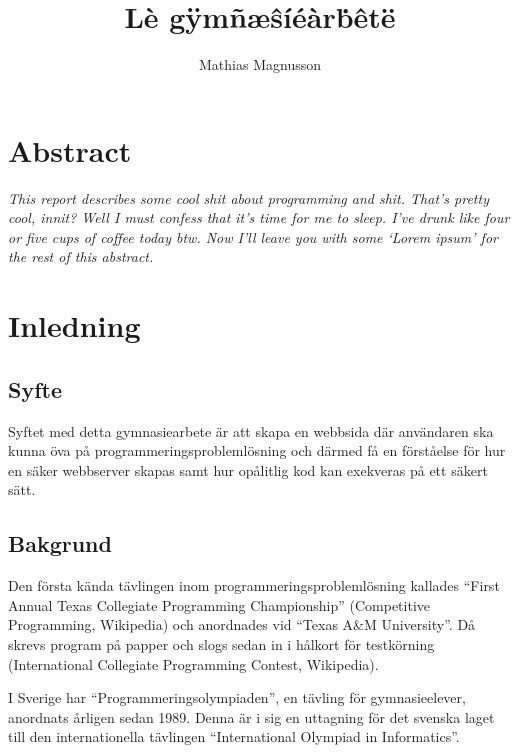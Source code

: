 \documentclass{article}
\author{Mathias Magnusson}
\title{Lè gÿmñæŝíéàrḃêtë}
\date{}
\begin{document}
\maketitle{}

\section*{Abstract}

\begin{par}

\itshape
This report describes some cool shit about programming and shit. That's pretty
cool, innit? Well I must confess that it's time for me to sleep. I've drunk like
four or five cups of coffee today btw. Now I'll leave you with some `Lorem
ipsum' for the rest of this abstract. \lipsum[1-2]

\end{par}

\clearpage

\tableofcontents

\clearpage

\section{Inledning}

\subsection{Syfte}

Syftet med detta gymnasiearbete är att skapa en webbsida där användaren ska
kunna öva på programmeringsproblemlösning och därmed få en förståelse för hur
en säker webbserver skapas samt hur opålitlig kod kan exekveras på ett säkert
sätt.

\subsection{Bakgrund}

Den första kända tävlingen inom programmeringsproblemlösning kallades ``First
Annual Texas Collegiate Programming Championship'' (Competitive Programming,
Wikipedia) och anordnades vid ``Texas A\&M University''. Då skrevs program på
papper och slogs sedan in i hålkort för testkörning (International Collegiate
Programming Contest, Wikipedia).

I Sverige har ``Programmeringsolympiaden'', en tävling för gymnasieelever,
anordnats årligen sedan 1989. Denna är i sig en uttagning för det svenska laget
till den internationella tävlingen ``International Olympiad in Informatics''.
\end{document}
